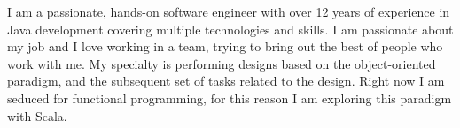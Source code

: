 \documentclass[9pt]{developercv} %
\begin{document}
\vspace{0.5cm}



\begin{minipage}[t]{0.4\textwidth} %
	\vspace{-\baselineskip} %
	
	I am a passionate, hands-on software engineer with over 12 years of experience in Java
	development covering multiple technologies and skills. I am passionate about my job and I
	love working in a team, trying to bring out the best of people who work with me. My specialty
	is performing designs based on the object-oriented paradigm, and the subsequent set of
	tasks related to the design. Right now I am seduced for functional programming, for this reason I am
	exploring this paradigm with Scala.
\end{minipage}
\hfill %
\begin{minipage}[t]{0.5\textwidth} %
	\vspace{-\baselineskip} %
	\begin{barchart}{5.5}
	\end{barchart}
\end{minipage}

\begin{center}
\end{center}


\end{document}

